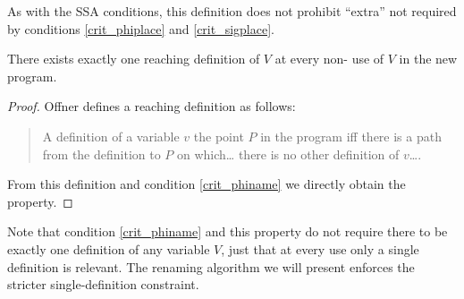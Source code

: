 \documentclass[12pt,titlepage,twoside]{article}
\begin{document}
As with the SSA conditions, this definition does not prohibit
``extra''  not required by conditions
\ref{crit_phiplace} and \ref{crit_sigplace}.

\begin{property}
There exists exactly one reaching definition of $V$ at every 
non-\phifunction{} use of $V$ in the new program.
\end{property}
\begin{proof}
Offner \cite{offner95} defines a reaching definition as follows:
\begin{quote}
A definition of a variable $v$  the point $P$ in the
program iff there is a path from the definition to $P$ on which\ldots
there is no other definition of $v$\ldots.
\end{quote}
From this definition and condition \ref{crit_phiname} we directly
obtain the property.
\end{proof}

Note that condition \ref{crit_phiname} and this property do not require
there to be exactly one definition of any variable $V$, just that at
every use only a single definition is relevant.  The renaming
algorithm we will present enforces the stricter single-definition
constraint.
\end{document}
